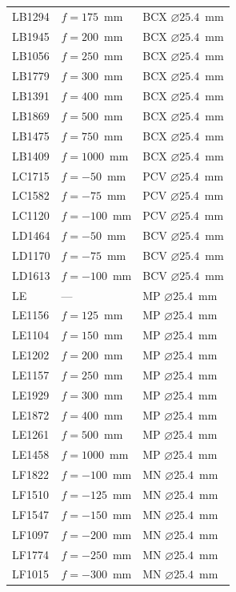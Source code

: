 \documentclass[11pt, letterpaper]{article}
\begin{document}
\begin{longtable}{@{} p{} p{} p{} @{}}
LB1294 & $f=175$~mm & BCX $\varnothing 25.4$~mm \\
LB1945 & $f=200$~mm & BCX $\varnothing 25.4$~mm \\
LB1056 & $f=250$~mm & BCX $\varnothing 25.4$~mm \\
LB1779 & $f=300$~mm & BCX $\varnothing 25.4$~mm \\
LB1391 & $f=400$~mm & BCX $\varnothing 25.4$~mm \\
LB1869 & $f=500$~mm & BCX $\varnothing 25.4$~mm \\
LB1475 & $f=750$~mm & BCX $\varnothing 25.4$~mm \\
LB1409 & $f=1000$~mm & BCX $\varnothing 25.4$~mm \\
LC1715 & $f=-50$~mm & PCV $\varnothing 25.4$~mm \\
LC1582 & $f=-75$~mm & PCV $\varnothing 25.4$~mm \\
LC1120 & $f=-100$~mm & PCV $\varnothing 25.4$~mm \\
LD1464 & $f=-50$~mm & BCV $\varnothing 25.4$~mm \\
LD1170 & $f=-75$~mm & BCV $\varnothing 25.4$~mm \\
LD1613 & $f=-100$~mm & BCV $\varnothing 25.4$~mm \\
LE     & --- & MP $\varnothing 25.4$~mm \\
LE1156 & $f=125$~mm & MP $\varnothing 25.4$~mm \\
LE1104 & $f=150$~mm & MP $\varnothing 25.4$~mm \\
LE1202 & $f=200$~mm & MP $\varnothing 25.4$~mm \\
LE1157 & $f=250$~mm & MP $\varnothing 25.4$~mm \\
LE1929 & $f=300$~mm & MP $\varnothing 25.4$~mm \\
LE1872 & $f=400$~mm & MP $\varnothing 25.4$~mm \\
LE1261 & $f=500$~mm & MP $\varnothing 25.4$~mm \\
LE1458 & $f=1000$~mm & MP $\varnothing 25.4$~mm \\
LF1822 & $f=-100$~mm & MN $\varnothing 25.4$~mm \\
LF1510 & $f=-125$~mm & MN $\varnothing 25.4$~mm \\
LF1547 & $f=-150$~mm & MN $\varnothing 25.4$~mm \\
LF1097 & $f=-200$~mm & MN $\varnothing 25.4$~mm \\
LF1774 & $f=-250$~mm & MN $\varnothing 25.4$~mm \\
LF1015 & $f=-300$~mm & MN $\varnothing 25.4$~mm \\

\end{longtable}
\end{document}
